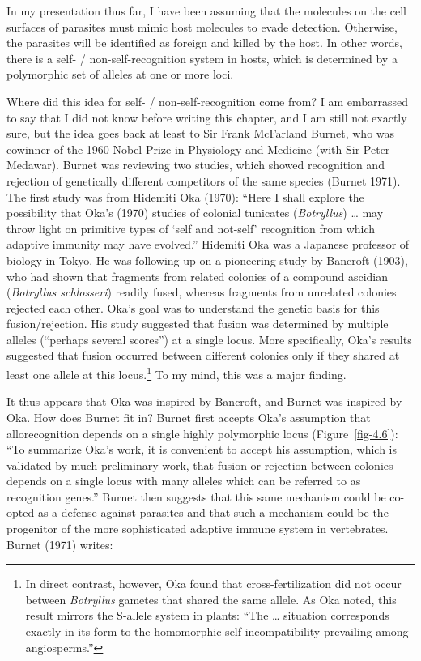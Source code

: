 \documentclass[
  letterpaper,
]{book}
\begin{document}
In my presentation thus far, I have been assuming that the molecules on
the cell surfaces of parasites must mimic host molecules to evade
detection. Otherwise, the parasites will be identified as foreign and
killed by the host. In other words, there is a self- /
non-self-recognition system in hosts, which is determined by a
polymorphic set of alleles at one or more loci.

Where did this idea for self- / non-self-recognition come from? I am
embarrassed to say that I did not know before writing this chapter, and
I am still not exactly sure, but the idea goes back at least to Sir
Frank McFarland Burnet, who was cowinner of the 1960 Nobel Prize in
Physiology and Medicine (with Sir Peter Medawar). Burnet was reviewing
two studies, which showed recognition and rejection of genetically
different competitors of the same species (Burnet 1971). The first study
was from Hidemiti Oka (1970): ``Here I shall explore the possibility
that Oka's (1970) studies of colonial tunicates (\emph{Botryllus})
\ldots{} may throw light on primitive types of `self and not-self'
recognition from which adaptive immunity may have evolved.'' Hidemiti
Oka was a Japanese professor of biology in Tokyo. He was following up on
a pioneering study by Bancroft (1903), who had shown that fragments from
related colonies of a compound ascidian (\emph{Botryllus schlosseri})
readily fused, whereas fragments from unrelated colonies rejected each
other. Oka's goal was to understand the genetic basis for this
fusion/rejection. His study suggested that fusion was determined by
multiple alleles (``perhaps several scores'') at a single locus. More
specifically, Oka's results suggested that fusion occurred between
different colonies only if they shared at least one allele at this
locus.\footnote{In direct contrast, however, Oka found that
  cross-fertilization did not occur between \emph{Botryllus} gametes
  that shared the same allele. As Oka noted, this result mirrors the
  S-allele system in plants: ``The \ldots{} situation corresponds
  exactly in its form to the homomorphic self-incompatibility prevailing
  among angiosperms.''} To my mind, this was a major finding.

It thus appears that Oka was inspired by Bancroft, and Burnet was
inspired by Oka. How does Burnet fit in? Burnet first accepts Oka's
assumption that allorecognition depends on a single highly polymorphic
locus (Figure~\ref{fig-4.6}): ``To summarize Oka's work, it is
convenient to accept his assumption, which is validated by much
preliminary work, that fusion or rejection between colonies depends on a
single locus with many alleles which can be referred to as recognition
genes.'' Burnet then suggests that this same mechanism could be co-opted
as a defense against parasites and that such a mechanism could be the
progenitor of the more sophisticated adaptive immune system in
vertebrates. Burnet (1971) writes:
\end{document}
